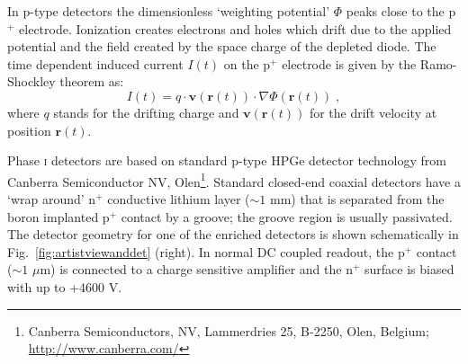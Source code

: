 In p-type detectors the dimensionless `weighting potential' $\Phi$ peaks close to the p$^+$ electrode. Ionization creates electrons and holes which drift due to the applied potential and the field created by the space charge of the depleted diode. The time dependent induced current $I(t)$ on the p$^+$ electrode is given by the Ramo-Shockley theorem \cite{schockley-ramo} as:
\begin{equation}I(t)=q\cdot\mathbf{v}(\mathbf{r}(t))\cdot\nabla\Phi(\mathbf{r}(t))\;,\end{equation}
where $q$ stands for the drifting charge and $\mathbf{v}(\mathbf{r}(t))$ for the drift velocity at position $\mathbf{r}(t)$.

Phase \textsc{i} detectors are based on standard p-type HPGe detector technology from Canberra Semiconductor NV, Olen\footnote{Canberra Semiconductors, NV, Lammerdries 25, B-2250, Olen, Belgium; \url{http://www.canberra.com/}}. Standard closed-end coaxial detectors have a `wrap around' $\text{n}^+$ conductive lithium layer ($\sim1$ mm) that is separated from the boron implanted $\text{p}^+$ contact by a groove; the groove region is usually passivated. The detector geometry for one of the enriched detectors is shown schematically in Fig.~\ref{fig:artistviewanddet} (right). In normal DC coupled readout, the p$^+$ contact ($\sim1$ $\mu$m) is connected to a charge sensitive amplifier and the n$^+$ surface is biased with up to +4600 V.

